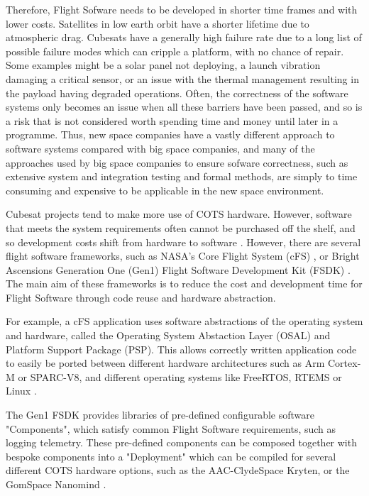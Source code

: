 \documentclass[../report.tex]{subfiles}
\begin{document}
Therefore, Flight Sofware needs to be developed in shorter time frames and with
lower costs. Satellites in low earth orbit have a shorter lifetime due to
atmospheric drag. Cubesats have a generally high failure rate due to a long
list of possible failure modes which can cripple a platform, with no chance of
repair. Some examples might be a solar panel not deploying, a launch vibration
damaging a critical sensor, or an issue with the thermal management resulting
in the payload having degraded operations. Often, the correctness of the
software systems only becomes an issue when all these barriers have been
passed, and so is a risk that is not considered worth spending time and money
until later in a programme. Thus, new space companies have a vastly different
approach to software systems compared with big space companies, and many of the
approaches used by big space companies to ensure sofware correctness, such as
extensive system and integration testing and formal methods, are simply to time
consuming and expensive to be applicable in the new space environment.

Cubesat projects tend to make more use of COTS hardware. However, software that
meets the system requirements often cannot be purchased off the shelf, and so
development costs shift from hardware to software
\citep{Cubesat_Handbook_OBSW}. However, there are several flight software
frameworks, such as NASA's Core Flight System (cFS) \citep{Nasa_cFS}, or Bright
Ascensions Generation One (Gen1) Flight Software Development Kit (FSDK)
\citep{Bal_FSDK}. The main aim of these frameworks is to reduce the cost and
development time for Flight Software through code reuse and hardware
abstraction.

For example, a cFS application uses software abstractions of the operating
system and hardware, called the Operating System Abstaction Layer (OSAL) and
Platform Support Package (PSP). This allows correctly written application
code to easily be ported between different hardware architectures such as Arm
Cortex-M or SPARC-V8, and different operating systems like FreeRTOS, RTEMS or
Linux \citep{Nasa_cFS}.

The Gen1 FSDK provides libraries of pre-defined configurable software
"Components", which satisfy common Flight Software requirements, such as
logging telemetry. These pre-defined components can be composed together with
bespoke components into a "Deployment" which can be compiled for several
different COTS hardware options, such as the AAC-ClydeSpace Kryten, or the
GomSpace Nanomind \citep{Bal_Options}.
\end{document}
